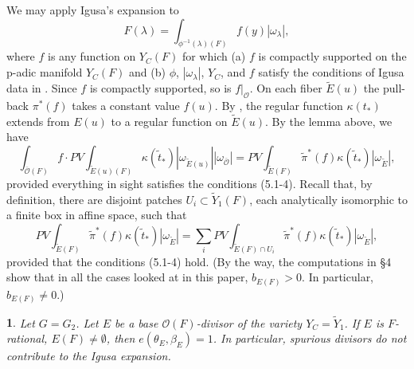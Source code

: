 \documentclass[12pt,letterpaper]{amsart}
\newcommand{\ooo}{\mathcal{O}}
\newcommand{\ovo}{\overline{\mathcal{O}}}
\newcommand{\proclaimname}{}
\newtheorem*{proclaimx}{\proclaimname}
\newenvironment{proclaim}[1]%
  {\renewcommand{\proclaimname}{#1}\begin{proclaimx}}{\end{proclaimx}}
\begin{document}
We may apply Igusa's expansion to
\[
F(\lambda)=
\int_{\phi^{-1}(\lambda)(F)}f(y)|\omega_\lambda|,
\tag{5.11}
\]
where $f$ is any function on $Y_C(F)$ for which (a) $f$ is compactly
supported on the p-adic manifold $Y_C(F)$ and (b) $\phi$, $|\omega_\lambda|$,
$Y_C$, and $f$ satisfy the conditions of Igusa data in \cite{LS83}.
Since $f$ is compactly supported, so is $f|_{\ooo}$. On each fiber
$\tilde{E}(u)$ the pull-back $\pi^*(f)$ takes a constant value $f(u)$.
By \cite[Ch I]{Ha92a}, the regular function $\kappa(t_*)$ extends
from $E(u)$ to a regular function on $\tilde{E}(u)$. By the lemma
above, we have
\[
\int_{\overline{\ooo}(F)}f \cdot
PV\int_{\tilde{E}(u)(F)}\kappa(\tilde{t}_*)
|\omega_{\tilde{E}(u)}||\omega_{\ovo}|=
PV\int_{\tilde{E}(F)}\tilde{\pi}^*(f) \kappa(\tilde{t}_*)
|\omega_{\tilde{E}}|,
\tag{5.12}
\]
provided everything in sight satisfies the conditions (5.1-4).
Recall that, by definition, there are disjoint patches
$U_i\subset \tilde{Y}_1(F)$,
each analytically isomorphic to a finite box in affine space, such that
\[
PV\int_{\tilde{E}(F)}\tilde{\pi}^*(f) \kappa(\tilde{t}_*)
|\omega_{\tilde{E}}|=
\sum_iPV\int_{\tilde{E}(F)\cap U_i}\tilde{\pi}^*(f) \kappa(\tilde{t}_*)
|\omega_{\tilde{E}}|,
\tag{5.13}
\]
provided that the conditions (5.1-4) hold.
(By the way, the computations in \S 4 show that in all
the cases looked at in this paper,
$b_{{E}(F)}>0$. In particular, $b_{{E}(F)}\not= 0$.)

\begin{proclaim}{Lemma 5.14}
Let $G=G_2$.
Let $E$ be a base ${\mathcal O}(F)$-divisor of the
variety $Y_C=\tilde{Y}_1$. If $E$ is $F$-rational, $E(F)\not= \emptyset$,
then $e(\theta_E,\beta_E)=1$. In particular, spurious divisors
do not contribute to the Igusa expansion.
\end{proclaim}
\end{document}
